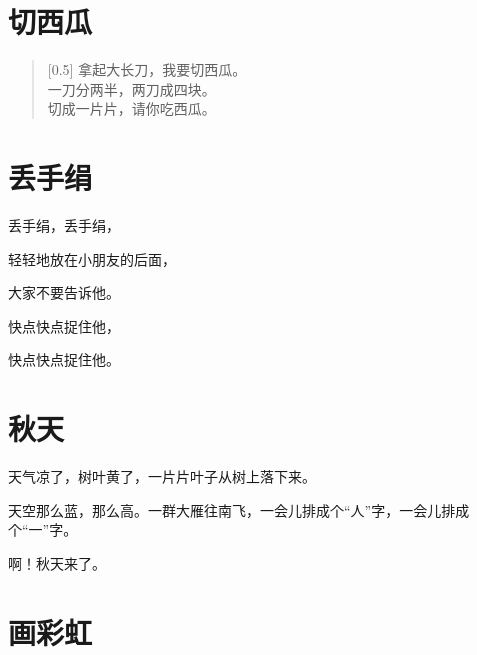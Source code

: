 \documentclass[12pt,UTF-8,openany]{ctexbook}
\begin{document}
\chapter{切西瓜}

\begin{large}
    
    \begin{verse}[0.5\linewidth]
        拿起大长刀，我要切西瓜。 \\
        一刀分两半，两刀成四块。 \\
        切成一片片，请你吃西瓜。
    \end{verse}
    
\end{large}





\chapter{丢手绢}

\begin{large}
    
    丢手绢，丢手绢，
    
    轻轻地放在小朋友的后面，
    
    大家不要告诉他。
    
    快点快点捉住他，
    
    快点快点捉住他。
    
\end{large}





\chapter{秋天}

\begin{large}
    
    天气凉了，树叶黄了，一片片叶子从树上落下来。
    
    天空那么蓝，那么高。一群大雁往南飞，一会儿排成个“人”字，一会儿排成个“一”字。
    
    啊！秋天来了。
    
\end{large}





\chapter{画彩虹}
\end{document}
